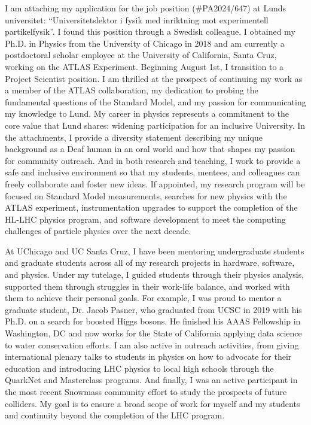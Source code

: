 I am attaching my application for the job position (\#PA2024/647) at Lunds universitet: \enquote{Universitetslektor i fysik med inriktning mot experimentell partikelfysik}. I found this position through a Swedish colleague. I obtained my Ph.D. in Physics from the University of Chicago in 2018 and am currently a postdoctoral scholar employee at the University of California, Santa Cruz, working on the ATLAS Experiment. Beginning August 1st, I transition to a Project Scientist position. I am thrilled at the prospect of continuing my work as a member of the ATLAS collaboration, my dedication to probing the fundamental questions of the Standard Model, and my passion for communicating my knowledge to Lund. My career in physics represents a commitment to the core value that Lund shares: widening participation for an inclusive University. In the attachments, I provide a diversity statement describing my unique background as a Deaf human in an oral world and how that shapes my passion for community outreach. And in both research and teaching, I work to provide a safe and inclusive environment so that my students, mentees, and colleagues can freely collaborate and foster new ideas. If appointed, my research program will be focused on Standard Model measurements, searches for new physics with the ATLAS experiment, instrumentation upgrades to support the completion of the HL-LHC physics program, and software development to meet the computing challenges of particle physics over the next decade.

At UChicago and UC Santa Cruz, I have been mentoring undergraduate students and graduate students across all of my research projects in hardware, software, and physics. Under my tutelage, I guided students through their physics analysis, supported them through struggles in their work-life balance, and worked with them to achieve their personal goals. For example, I was proud to mentor a graduate student, Dr. Jacob Pasner, who graduated from UCSC in 2019 with his Ph.D. on a search for boosted Higgs bosons. He finished his AAAS Fellowship in Washington, DC and now works for the State of California applying data science to water conservation efforts. I am also active in outreach activities, from giving international plenary talks to students in physics on how to advocate for their education and introducing LHC physics to local high schools through the QuarkNet and Masterclass programs. And finally, I was an active participant in the most recent Snowmass community effort to study the prospects of future colliders. My goal is to ensure a broad scope of work for myself and my students and continuity beyond the completion of the LHC program.

